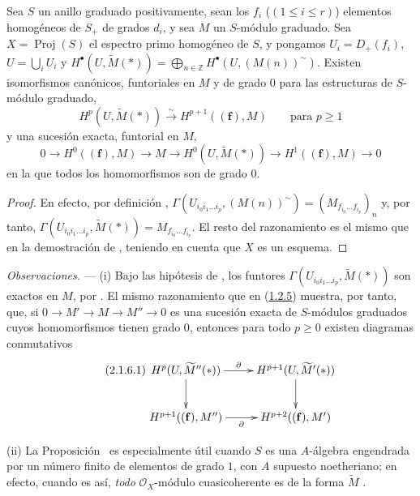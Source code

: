 \begin{proposition}[2.1.5]
\label{III.2.1.5}
\label{III.2.1.5-fr}
Sea $S$ un anillo graduado positivamente, sean los $f_i$ ($(1\leq i\leq r)$) elementos homogéneos de $S_+$ de grados $d_i$, y sea $M$ un $S$-módulo graduado.
Sea $X=\operatorname{Proj}(S)$ el espectro primo homogéneo de $S$, y pongamos $U_i=D_+(f_i)$, $U=\bigcup_iU_i$ y $H^\bullet(U,\widetilde M(*))
=\bigoplus_{n\in\mathbb Z}H^\bullet(U,(M(n))^\sim)$.
Existen isomorfismos canónicos, funtoriales en $M$ y de grado $0$ para las estructuras de $S$-módulo graduado,
\begin{equation}
\label{III.2.1.5.1-fr}
\tag{2.1.5.1}
H^p(U,\widetilde M(*))\xrightarrow{\sim}H^{p+1}((\mathbf f),M)
\qquad\text{para }p\geq1
\end{equation}
y una sucesión exacta, funtorial en $M$,
\begin{equation}
\label{III.2.1.5.2-fr}
\tag{2.1.5.2}
0\longrightarrow H^0((\mathbf f),M)\longrightarrow M
\longrightarrow H^0(U,\widetilde M(*))
\longrightarrow H^1((\mathbf f),M)\longrightarrow0
\end{equation}
en la que todos los homomorfismos son de grado $0$.
\end{proposition}

\begin{proof}
En efecto, por definición ,
$\Gamma(U_{i_0i_1\ldots i_p},(M(n))^\sim)
=(M_{f_{i_0}\ldots f_{i_p}})_n$
y, por tanto, $\Gamma(U_{i_0i_1\ldots i_p},\widetilde M(*))
=M_{f_{i_0}\ldots f_{i_p}}$.
El resto del razonamiento es el mismo que en la demostración de , teniendo en cuenta que $X$ es un esquema.
\end{proof}

\begin{env}[2.1.6]
\label{III.2.1.6}
\label{III.2.1.6-fr}
\emph{Observaciones.} ---
(i) Bajo las hipótesis de , los funtores $\Gamma(U_{i_0i_1\ldots i_p},\widetilde M(*))$ son exactos en $M$, por .
El mismo razonamiento que en (\hyperref[III.1.2.5]{1.2.5}) muestra, por tanto, que, si $0\to M'\to M\to M''\to0$ es una sucesión exacta de $S$-módulos graduados cuyos homomorfismos tienen grado $0$, entonces para todo $p\geq0$ existen diagramas conmutativos
\begin{equation}
\label{III.2.1.6.1-fr}
\tag{2.1.6.1}
\xymatrix{
H^p(U,\widetilde{M}''(*))\ar[r]^-\partial\ar[d] &
H^{p+1}(U,\widetilde{M}'(*))\ar[d]\\
H^{p+1}((\mathbf f),M'')\ar[r]_-\partial &
H^{p+2}((\mathbf f),M')
}
\end{equation}

(ii) La Proposición~ es especialmente útil cuando $S$ es una $A$-álgebra engendrada por un número finito de elementos de grado $1$, con $A$ supuesto noetheriano; en
efecto, cuando es así, \emph{todo} $\mathcal O_X$-módulo cuasicoherente es de la forma $\widetilde M$ .
\end{env}

